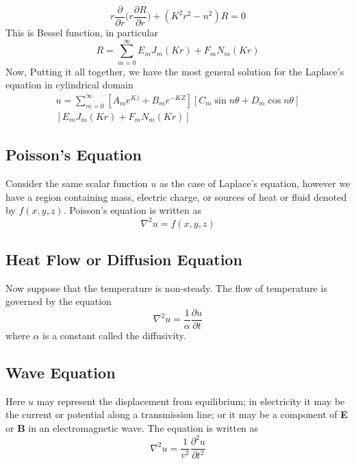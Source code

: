 \documentclass[../main.tex]{subfiles}
\begin{document}
\begin{equation*}
    r\frac{\partial}{\partial r}\Biggl(r\frac{\partial R}{\partial r}\Biggr)
    +(K^2r^2-n^2)R=0
\end{equation*}
This is Bessel function, in particular
\begin{equation*}
    R=\sum_{m=0}^{\infty}E_mJ_m(Kr)+F_mN_m(Kr)
\end{equation*}
Now, Putting it all together, we have the most general solution for the Laplace's equation in cylindrical domain 
\begin{multline*}
    u=\sum_{m=0}^{\infty}\left[A_me^{Kz}+B_me^{-KZ}\right]\left[C_m\sin n\theta +D_m\cos n\theta\right]\\
    \left[E_mJ_m(Kr)+F_mN_m(Kr)\right]
\end{multline*}

\subsection*{Poisson’s Equation}
Consider the same scalar function $u$ as the case of Laplace's equation, however we have a region containing mass, electric charge, or sources of heat or fluid denoted by $f(x,y,z)$. Poisson's equation is written as 
\begin{equation*}
    \nabla^2 u=f(x,y,z)
\end{equation*}

\subsection*{Heat Flow or Diffusion Equation}
Now suppose that the temperature is non-steady. The flow of temperature is governed by the equation 
\begin{equation*}
    \nabla^2 u=\frac{1}{\alpha}\frac{\partial u}{\partial t}
\end{equation*}
where $\alpha$ is a constant called the diﬀusivity.

\subsection*{Wave Equation}
Here $u$ may represent the displacement from equilibrium; in electricity it may be the current or potential along a transmission line; or it may be a component of \textbf{E} or \textbf{B} in an electromagnetic wave. The equation is written as 
\begin{equation*}
    \nabla^2u=\frac{1}{v^2}\frac{\partial^2u}{\partial t^2}
\end{equation*}
\end{document}
